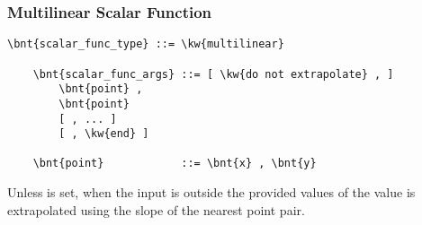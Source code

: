 \subsubsection{Multilinear Scalar Function}
\begin{Verbatim}[commandchars=\\\{\}]
    \bnt{scalar_func_type} ::= \kw{multilinear}

    \bnt{scalar_func_args} ::= [ \kw{do not extrapolate} , ]
        \bnt{point} , 
        \bnt{point}
        [ , ... ]
        [ , \kw{end} ]

    \bnt{point}            ::= \bnt{x} , \bnt{y}
\end{Verbatim}
Unless  is set, when the input is outside
the provided values of  the value is extrapolated using the slope
of the nearest point pair.

